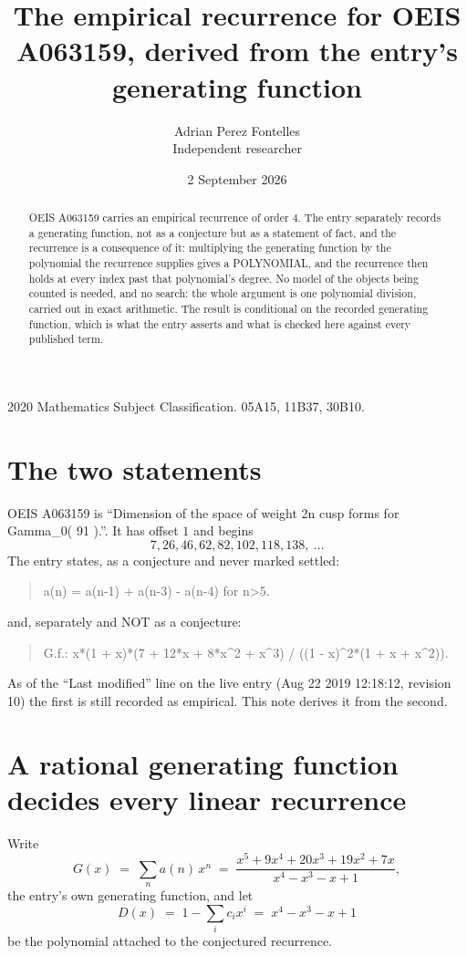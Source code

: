 \documentclass[11pt,a4paper]{article}
\title{The empirical recurrence for OEIS A063159, derived from the entry's generating function}
\author{Adrian Perez Fontelles\\ \small Independent researcher}
\date{2 September 2026}
\theoremstyle{plain}
\theoremstyle{definition}
\begin{document}
\maketitle

\begin{abstract}
OEIS A063159 carries an empirical recurrence of order $4$. The entry separately records a
generating function, not as a conjecture but as a statement of fact, and the recurrence is a
consequence of it: multiplying the generating function by the polynomial the recurrence
supplies gives a POLYNOMIAL, and the recurrence then holds at every index past that
polynomial's degree. No model of the objects being counted is needed, and no search: the
whole argument is one polynomial division, carried out in exact arithmetic. The result is
conditional on the recorded generating function, which is what the entry asserts and what is
checked here against every published term.
\end{abstract}

\noindent\small 2020 Mathematics Subject Classification. 05A15, 11B37, 30B10.\normalsize

\section{The two statements}

OEIS A063159 is ``Dimension of the space of weight 2n cusp forms for Gamma\_0( 91 ).''. It has offset $1$ and begins
\[
7, 26, 46, 62, 82, 102, 118, 138,\ \dots
\]
The entry states, as a conjecture and never marked settled:
\begin{quote}
a(n) = a(n-1) + a(n-3) - a(n-4) for n>5.
\end{quote}
and, separately and NOT as a conjecture:
\begin{quote}
G.f.: x*(1 + x)*(7 + 12*x + 8*x\^{}2 + x\^{}3) / ((1 - x)\^{}2*(1 + x + x\^{}2)).
\end{quote}
As of the ``Last modified'' line on the live entry (Aug 22 2019 12:18:12, revision 10) the first is still
recorded as empirical. This note derives it from the second.

\section{A rational generating function decides every linear recurrence}

Write
\[
G(x)\;=\;\sum_{n}a(n)\,x^{n}\;=\;\frac{x^{5} + 9 x^{4} + 20 x^{3} + 19 x^{2} + 7 x}{x^{4} - x^{3} - x + 1},
\]
the entry's own generating function, and let
\[
D(x)\;=\;1-\sum_i c_i x^{i}\;=\;x^{4} - x^{3} - x + 1
\]
be the polynomial attached to the conjectured recurrence.
\end{document}
